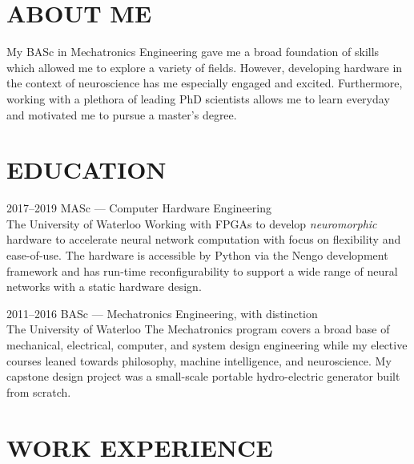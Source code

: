 \documentclass[a4paper,nocolors]{cv-friggeri-ben}
\begin{document}
\section{ABOUT ME}
\vspace{-2pt}

\vspace{-5pt}
My BASc in Mechatronics Engineering gave me a broad foundation of skills which
allowed me to explore a variety of fields. However, developing hardware in the
context of neuroscience has me especially engaged and excited. Furthermore,
working with a plethora of leading PhD scientists allows me to learn everyday
and motivated me to pursue a master's degree.



\section{EDUCATION}
\vspace{-2pt}

\begin{entrylist}

\entry
    {2017--2019}
    {MASc {\normalfont --- Computer Hardware Engineering}}
    {\\The University of Waterloo}
    {Working with FPGAs to develop \textit{neuromorphic} hardware to
    accelerate neural network computation with focus on flexibility and
    ease-of-use. The hardware is accessible by Python via the Nengo development
    framework and has run-time reconfigurability to support a wide range of
    neural networks with a static hardware design.}

\entry
    {2011--2016}
    {BASc {\normalfont --- Mechatronics Engineering, with distinction}}
    {\\The University of Waterloo}
    {The Mechatronics program covers a broad base of mechanical, electrical,
    computer, and system design engineering while my elective courses leaned
    towards philosophy, machine intelligence, and neuroscience. My capstone
    design project was a small-scale portable hydro-electric generator built
    from scratch.}

\end{entrylist}


\section{WORK EXPERIENCE}
\vspace{-2pt}
\end{document}
